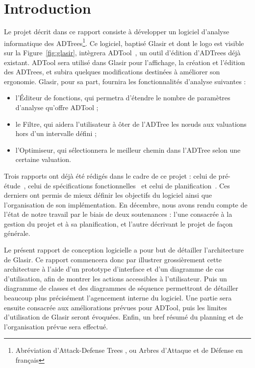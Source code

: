 \section{Introduction}
    \label{sec:intro}

    Le projet décrit dans ce rapport consiste à développer un logiciel d'analyse informatique des ADTrees\footnote{Abréviation d'\og Attack-Defense Trees \fg{}, ou \og Arbres d'Attaque et de Défense\fg{} en français}. Ce logiciel, baptisé Glasir et dont le logo est visible sur la {\sc Figure}~\ref{fig:glasir}, intègrera ADTool~\cite{ADTool}, un outil d'édition d'ADTrees déjà existant. ADTool sera utilisé dans Glasir pour l'affichage, la création et l'édition des ADTrees, et subira quelques modifications destinées à améliorer son ergonomie. Glasir, pour sa part, fournira les fonctionnalités d'analyse suivantes :

    \begin{itemize}
    	\item l'Éditeur de fonctions, qui permetra d'étendre le nombre de paramètres d'analyse qu'offre ADTool ;
    	\item le Filtre, qui aidera l'utilisateur à ôter de l'ADTree les nœuds aux valuations hors d'un intervalle défini ;
    	\item l'Optimiseur, qui sélectionnera le meilleur chemin dans l'ADTree selon une certaine valuation.
    \end{itemize} 

    Trois rapports ont déjà été rédigés dans le cadre de ce projet : celui de pré-étude~\cite{pre_etude}, celui de spécifications fonctionnelles~\cite{spec_fonc} et celui de planification~\cite{planif}. Ces derniers ont permis de mieux définir les objectifs du logiciel ainsi que l'organisation de son implémentation. En décembre, nous avons rendu compte de l'état de notre travail par le biais de deux soutenances : l'une consacrée à la gestion du projet et à sa planification, et l'autre décrivant le projet de façon générale. 

    Le présent rapport de conception logicielle a pour but de détailler l'architecture de Glasir. Ce rapport commencera donc par illustrer grossièrement cette architecture à l'aide d'un prototype d'interface et d'un diagramme de cas d'utilisation, afin de montrer les actions accessibles à l'utilisateur. Puis un diagramme de classes et des diagrammes de séquence permettront de détailler beaucoup plus précisément l'agencement interne du logiciel. Une partie sera ensuite consacrée aux améliorations prévues pour ADTool, puis les limites d'utilisation de Glasir seront évoquées. Enfin, un bref résumé du planning et de l'organisation prévue sera effectué.

